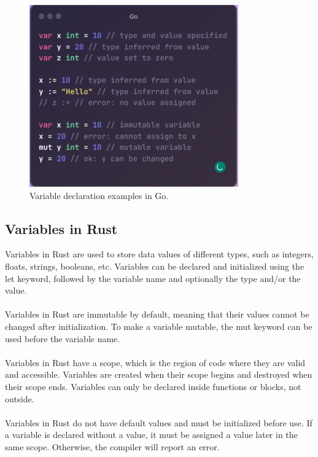 \documentclass{dclass}
\begin{document}
\begin{figure}[h!]
\begin{center}
\includegraphics[width=9.0cm]{go_variables.png}
\caption{Variable declaration examples in Go.}
\label{fig1}
\end{center}\vs{-4mm}
\end{figure}

\subsection{Variables in Rust}

Variables in Rust are used to store data values of different types, such as integers, floats, strings, booleans, etc. Variables can be declared and initialized using the let keyword, followed by the variable name and optionally the type and/or the value.\\\\
Variables in Rust are immutable by default, meaning that their values cannot be changed after initialization. To make a variable mutable, the mut keyword can be used before the variable name.\\\\
Variables in Rust have a scope, which is the region of code where they are valid and accessible. Variables are created when their scope begins and destroyed when their scope ends. Variables can only be declared inside functions or blocks, not outside.\\\\
Variables in Rust do not have default values and must be initialized before use. If a variable is declared without a value, it must be assigned a value later in the same scope. Otherwise, the compiler will report an error.\cite{ref4}\\
\end{document}
